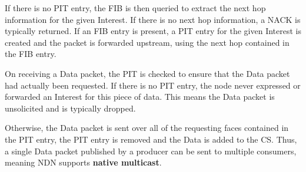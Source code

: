 If there is no PIT entry, the FIB is then queried to extract the next hop information for the given Interest. If there is no next hop information, a NACK is typically returned. If an FIB entry is present, a PIT entry for the given Interest is created and the packet is forwarded upstream, using the next hop contained in the FIB entry. 



On receiving a Data packet, the PIT is checked to ensure that the Data packet had actually been requested. If there is no PIT entry, the node never expressed or forwarded an Interest for this piece of data. This means the Data packet is unsolicited and is typically dropped.

Otherwise, the Data packet is sent over all of the requesting faces contained in the PIT entry, the PIT entry is removed and the Data is added to the CS. Thus, a single Data packet published by a producer can be sent to multiple consumers, meaning NDN supports \textbf{native multicast}.







